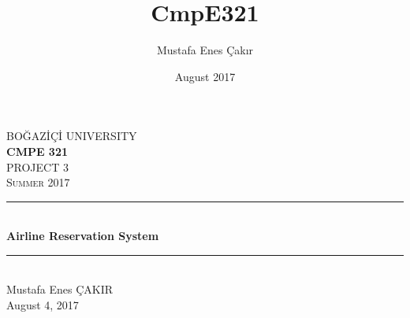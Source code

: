 \documentclass[12pt,a4paper]{article}
\title{CmpE321}
\author{Mustafa Enes Çakır}
\date{August 2017}
\begin{document}
\newenvironment{code}{\captionsetup{type=listing}}{}

\begin{titlepage}

\newcommand{\HRule}{\rule{\linewidth}{0.5mm}}

\center %


\textsc{\LARGE BOĞAZİÇİ UNIVERSITY}\\[1.5cm] %
\textbf{\Large CMPE 321}\\[0.5cm] %
\textsc{\large PROJECT 3}\\[2cm] %
\textsc{\large Summer 2017}\\[3cm] %


\HRule \\[0.4cm]
{ \huge \bfseries Airline Reservation System}\\[0.4cm] %
\HRule \\[4cm]


\Large Mustafa Enes ÇAKIR \\ [2cm] %


{\large August 4, 2017}\\[2cm] %
\vfill %
\end{titlepage}

\tableofcontents{}
\end{document}
